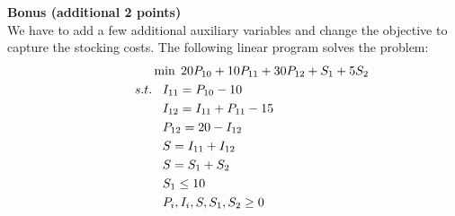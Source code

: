 \documentclass{article}[11 pt]    %
\begin{document}
\noindent \textbf{Bonus (additional 2 points)}
\\

\noindent We have to add a few additional auxiliary variables and change the objective to capture the stocking costs. The following linear program solves the problem:
\begin{align*}
\hspace{1.5cm}& \min \;20P_{10} + 10P_{11} + 30P_{12} +S_1 +5S_2 \\
s.t. &\;\;\; I_{11}= P_{10} -10  \\
&\;\;\; I_{12}=I_{11} + P_{11} - 15 \\
&\;\;\; P_{12}=20- I_{12}  \\
&\;\;\;S= I_{11} + I_{12} \\
&\;\;\; S=S_1 +S_2\\
&\;\;\; S_1 \leq 10 \\
&\;\;\; P_i, I_i, S, S_1,S_2 \geq 0
\end{align*}   
 
\end{document}
